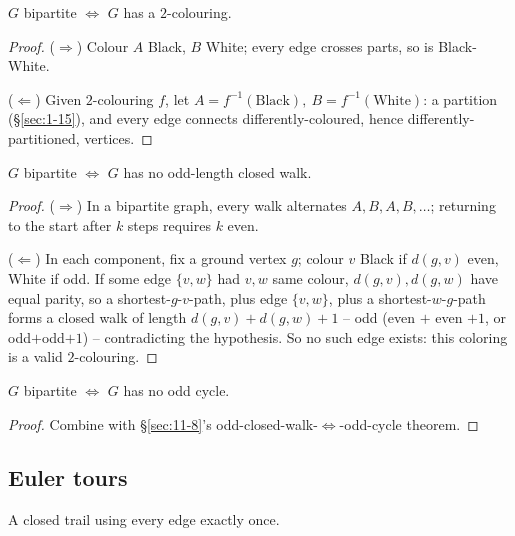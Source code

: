 \documentclass[11pt]{article}
\begin{document}
\begin{theorem}
$G$ bipartite $\iff$ $G$ has a $2$-colouring.
\end{theorem}
\begin{proof}
($\Rightarrow$) Colour $A$ Black, $B$ White; every edge crosses parts, so is Black-White.

($\Leftarrow$) Given $2$-colouring $f$, let $A=f^{-1}(\text{Black}),\ B=f^{-1}(\text{White})$: a partition (\S\ref{sec:1-15}), and every edge connects differently-coloured, hence differently-partitioned, vertices.
\end{proof}

\bigskip
\begin{theorem}
$G$ bipartite $\iff$ $G$ has no odd-length closed walk.
\end{theorem}
\begin{proof}
($\Rightarrow$) In a bipartite graph, every walk alternates $A,B,A,B,\dots$; returning to the start after $k$ steps requires $k$ even.

($\Leftarrow$) In each component, fix a ground vertex $g$; colour $v$ Black if $d(g,v)$ even, White if odd. If some edge $\{v,w\}$ had $v,w$ same colour, $d(g,v),d(g,w)$ have equal parity, so a shortest-$g$-$v$-path, plus edge $\{v,w\}$, plus a shortest-$w$-$g$-path forms a closed walk of length $d(g,v)+d(g,w)+1$ -- odd (even $+$ even $+1$, or odd$+$odd$+1$) -- contradicting the hypothesis. So no such edge exists: this coloring is a valid $2$-colouring.
\end{proof}

\begin{corollary}
$G$ bipartite $\iff$ $G$ has no odd cycle.
\end{corollary}
\begin{proof}
Combine with \S\ref{sec:11-8}'s odd-closed-walk-$\iff$-odd-cycle theorem.
\end{proof}

\subsection{Euler tours}
\label{sec:11-11}

\begin{definition}
A closed trail using every edge exactly once.
\end{definition}
\end{document}
